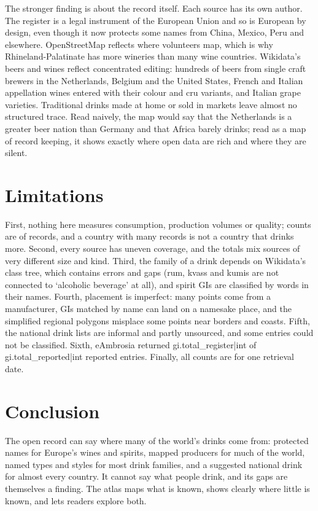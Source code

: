 \documentclass[11pt,a4paper]{article}
\begin{document}
The stronger finding is about the record itself. Each source has its own author. The register is a legal instrument of the European Union and so is European by design, even though it now protects some names from China, Mexico, Peru and elsewhere. OpenStreetMap reflects where volunteers map, which is why Rhineland-Palatinate has more wineries than many wine countries. Wikidata's beers and wines reflect concentrated editing: hundreds of beers from single craft brewers in the Netherlands, Belgium and the United States, French and Italian appellation wines entered with their colour and cru variants, and Italian grape varieties. Traditional drinks made at home or sold in markets leave almost no structured trace. Read naively, the map would say that the Netherlands is a greater beer nation than Germany and that Africa barely drinks; read as a map of record keeping, it shows exactly where open data are rich and where they are silent.

\section{Limitations}
First, nothing here measures consumption, production volumes or quality; counts are of records, and a country with many records is not a country that drinks more. Second, every source has uneven coverage, and the totals mix sources of very different size and kind. Third, the family of a drink depends on Wikidata's class tree, which contains errors and gaps (rum, kvass and kumis are not connected to `alcoholic beverage' at all), and spirit GIs are classified by words in their names. Fourth, placement is imperfect: many points come from a manufacturer, GIs matched by name can land on a namesake place, and the simplified regional polygons misplace some points near borders and coasts. Fifth, the national drink lists are informal and partly unsourced, and some entries could not be classified. Sixth, eAmbrosia returned {{gi.total_register|int}} of {{gi.total_reported|int}} reported entries. Finally, all counts are for one retrieval date.

\section{Conclusion}
The open record can say where many of the world's drinks come from: protected names for Europe's wines and spirits, mapped producers for much of the world, named types and styles for most drink families, and a suggested national drink for almost every country. It cannot say what people drink, and its gaps are themselves a finding. The atlas maps what is known, shows clearly where little is known, and lets readers explore both.
\end{document}
